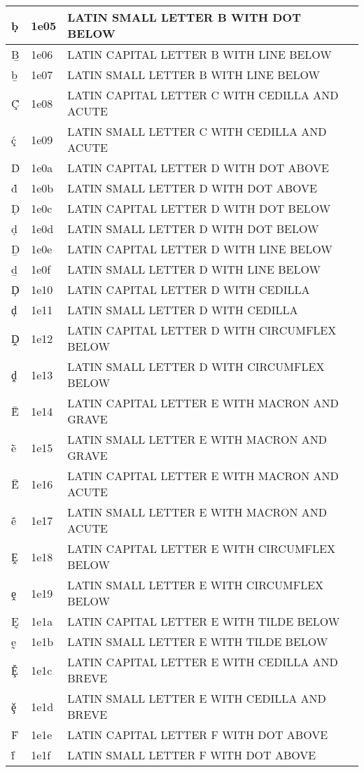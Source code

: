 \documentclass[12pt,letterpaper,openany]{book}
\begin{document}
\begin{center}
\begin{supertabular}{|m{0.25in}|m{0.5in}|m{4in}|}
ḅ & 1e05 & LATIN SMALL LETTER B WITH DOT BELOW\\\hline
Ḇ & 1e06 & LATIN CAPITAL LETTER B WITH LINE BELOW\\\hline
ḇ & 1e07 & LATIN SMALL LETTER B WITH LINE BELOW\\\hline
Ḉ & 1e08 & LATIN CAPITAL LETTER C WITH CEDILLA AND ACUTE\\\hline
ḉ & 1e09 & LATIN SMALL LETTER C WITH CEDILLA AND ACUTE\\\hline
Ḋ & 1e0a & LATIN CAPITAL LETTER D WITH DOT ABOVE\\\hline
ḋ & 1e0b & LATIN SMALL LETTER D WITH DOT ABOVE\\\hline
Ḍ & 1e0c & LATIN CAPITAL LETTER D WITH DOT BELOW\\\hline
ḍ & 1e0d & LATIN SMALL LETTER D WITH DOT BELOW\\\hline
Ḏ & 1e0e & LATIN CAPITAL LETTER D WITH LINE BELOW\\\hline
ḏ & 1e0f & LATIN SMALL LETTER D WITH LINE BELOW\\\hline
Ḑ & 1e10 & LATIN CAPITAL LETTER D WITH CEDILLA\\\hline
ḑ & 1e11 & LATIN SMALL LETTER D WITH CEDILLA\\\hline
Ḓ & 1e12 & LATIN CAPITAL LETTER D WITH CIRCUMFLEX BELOW\\\hline
ḓ & 1e13 & LATIN SMALL LETTER D WITH CIRCUMFLEX BELOW\\\hline
Ḕ & 1e14 & LATIN CAPITAL LETTER E WITH MACRON AND GRAVE\\\hline
ḕ & 1e15 & LATIN SMALL LETTER E WITH MACRON AND GRAVE\\\hline
Ḗ & 1e16 & LATIN CAPITAL LETTER E WITH MACRON AND ACUTE\\\hline
ḗ & 1e17 & LATIN SMALL LETTER E WITH MACRON AND ACUTE\\\hline
Ḙ & 1e18 & LATIN CAPITAL LETTER E WITH CIRCUMFLEX BELOW\\\hline
ḙ & 1e19 & LATIN SMALL LETTER E WITH CIRCUMFLEX BELOW\\\hline
Ḛ & 1e1a & LATIN CAPITAL LETTER E WITH TILDE BELOW\\\hline
ḛ & 1e1b & LATIN SMALL LETTER E WITH TILDE BELOW\\\hline
Ḝ & 1e1c & LATIN CAPITAL LETTER E WITH CEDILLA AND BREVE\\\hline
ḝ & 1e1d & LATIN SMALL LETTER E WITH CEDILLA AND BREVE\\\hline
Ḟ & 1e1e & LATIN CAPITAL LETTER F WITH DOT ABOVE\\\hline
ḟ & 1e1f & LATIN SMALL LETTER F WITH DOT ABOVE\\\hline

\end{supertabular}
\end{center}
\end{document}
